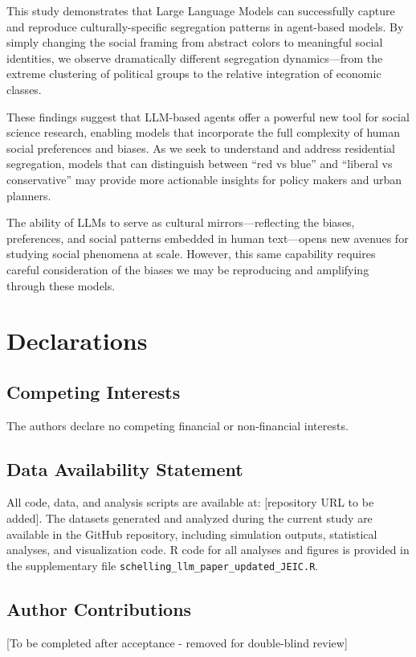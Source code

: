 \documentclass[pdflatex,sn-basic]{sn-jnl}%
\begin{document}
This study demonstrates that Large Language Models can successfully
capture and reproduce culturally-specific segregation patterns in
agent-based models. By simply changing the social framing from abstract
colors to meaningful social identities, we observe dramatically
different segregation dynamics---from the extreme clustering of
political groups to the relative integration of economic classes.

These findings suggest that LLM-based agents offer a powerful new tool
for social science research, enabling models that incorporate the full
complexity of human social preferences and biases. As we seek to
understand and address residential segregation, models that can
distinguish between ``red vs blue'' and ``liberal vs conservative'' may
provide more actionable insights for policy makers and urban planners.

The ability of LLMs to serve as cultural mirrors---reflecting the
biases, preferences, and social patterns embedded in human text---opens
new avenues for studying social phenomena at scale. However, this same
capability requires careful consideration of the biases we may be
reproducing and amplifying through these models.

\section*{Declarations}

\subsection*{Competing Interests}
The authors declare no competing financial or non-financial interests.

\subsection*{Data Availability Statement}
All code, data, and analysis scripts are available at: [repository URL to be added]. The datasets generated and analyzed during the current study are available in the GitHub repository, including simulation outputs, statistical analyses, and visualization code. R code for all analyses and figures is provided in the supplementary file \texttt{schelling\_llm\_paper\_updated\_JEIC.R}.

\subsection*{Author Contributions}
[To be completed after acceptance - removed for double-blind review]
\end{document}
